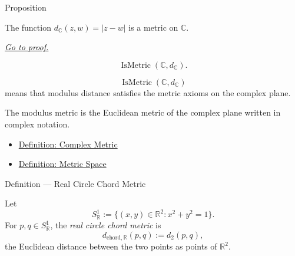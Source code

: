 \begin{propositionbox}{Proposition}
\begin{proposition}
\label{prop:complex-modulus-metric}
The function \(d_{\mathbb{C}}(z,w)=|z-w|\) is a metric on \(\mathbb{C}\).

\smallskip
\noindent
\hyperref[prf:complex-modulus-metric]{\textit{Go to proof.}}
\end{proposition}
\end{propositionbox}

\begin{remark*}
\[
  \operatorname{IsMetric}(\mathbb{C},d_{\mathbb{C}}).
\]
\end{remark*}

\begin{remark*}
\[
\operatorname{IsMetric}(\mathbb{C},d_{\mathbb{C}})
\]
means that modulus distance satisfies the metric axioms on the complex plane.
\end{remark*}

\begin{remark*}[Interpretation]
The modulus metric is the Euclidean metric of the complex plane written in
complex notation.
\end{remark*}


\begin{dependencies}
\begin{itemize}
  \item \hyperref[def:complex-metric]{Definition: Complex Metric}
  \item \hyperref[def:metric-space]{Definition: Metric Space}
\end{itemize}
\end{dependencies}

\begin{definitionbox}{Definition --- Real Circle Chord Metric}
\begin{definition}\label{def:real-circle-chord-metric}
Let
\[
  S^1_{\mathbb{R}}
  :=
  \{(x,y)\in\mathbb{R}^2 : x^2+y^2=1\}.
\]
For \(p,q\in S^1_{\mathbb{R}}\), the \emph{real circle chord metric} is
\[
  d_{\mathrm{chord},\mathbb{R}}(p,q):=d_2(p,q),
\]
the Euclidean distance between the two points as points of \(\mathbb{R}^2\).
\end{definition}
\end{definitionbox}

